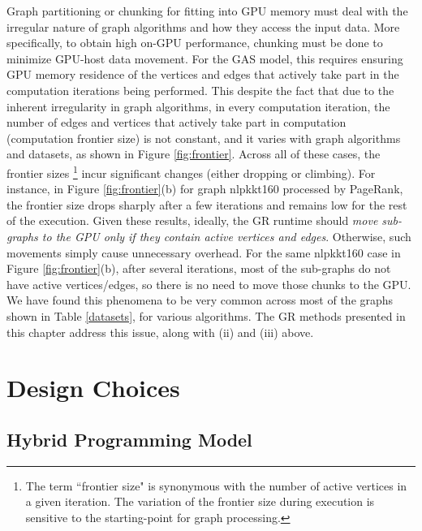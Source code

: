 Graph partitioning or chunking for fitting into GPU memory must deal with the irregular nature of 
graph algorithms and how they access the input data. More specifically, to obtain high on-GPU performance, chunking
must be done to minimize GPU-host data movement. For the GAS model, this requires ensuring GPU memory residence of 
the vertices and edges that actively take part in the computation iterations being performed.
This despite the fact that due to the inherent irregularity in graph algorithms, in every computation iteration, the number 
of edges and vertices that actively take part in computation (computation frontier size) is not constant, and it varies with 
graph algorithms and datasets, as shown in Figure \ref{fig:frontier}. Across all of these cases, the frontier sizes \footnote{\scriptsize The term ``frontier size" is synonymous with the number of active vertices in a given iteration. The variation of the frontier size during execution is sensitive to the starting-point for graph processing. } 
incur significant changes (either dropping or climbing). For instance, in Figure \ref{fig:frontier}(b) for graph nlpkkt160 processed 
by PageRank, the frontier size drops sharply after a few iterations and remains low for the rest of the execution. 
Given these results, ideally, the GR runtime should {\em move sub-graphs to the GPU only if they
contain active vertices and edges}. Otherwise, such movements simply cause unnecessary overhead.
For the same nlpkkt160 case in Figure \ref{fig:frontier}(b), after several iterations, most of the sub-graphs do not have 
active vertices/edges, so there is no need to move those chunks to the GPU. We have found this phenomena to be very common 
across most of the graphs shown in Table \ref{datasets}, for various algorithms. The GR methods presented in this chapter address this issue, along with (ii) and (iii) above.


\section{Design Choices}
\label{Choice}


\subsection{Hybrid Programming Model}
\label{3.1}
 
